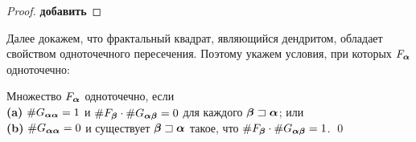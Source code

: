 \begin{proof}
{\bf добавить}
\end{proof}

Далее докажем, что фрактальный квадрат, являющийся дендритом, обладает свойством одноточечного пересечения.
Поэтому укажем условия, при которых $F_{\bm{\alpha}}$ одноточечно:

\begin{corollary}\label{onepoint} 
Множество $F_{\bm{\alpha}}$ одноточечно, если \\
\textbf{(a)} $\#G_{{\bm{\alpha}}{\bm{\alpha}}}=1$ и $\#F_{\bm{\beta}}\cdot\#G_{{\bm{\alpha}}{\bm{\beta}}}=0$ для каждого ${\bm{\beta}}\sqsupset{\bm{\alpha}}$; или\\
\textbf{(b)} $\#G_{{\bm{\alpha}}{\bm{\alpha}}}=0$ и существует ${\bm{\beta}}\sqsupset{\bm{\alpha}}$ такое, что $\#F_{\bm{\beta}}\cdot\#G_{{\bm{\alpha}}{\bm{\beta}}}=1$.
\hfill\qed
\end{corollary}

